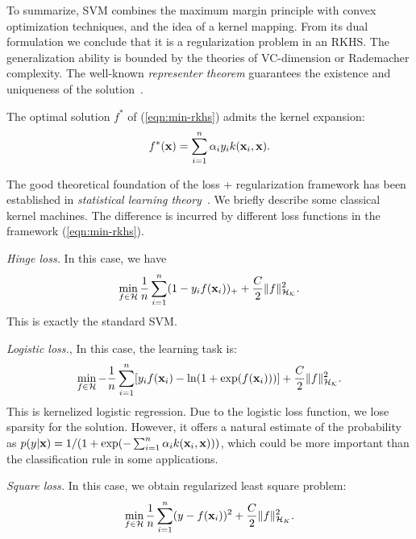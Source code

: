 To summarize, SVM combines the maximum margin principle with convex optimization techniques, and the idea of a kernel mapping. From its dual formulation we conclude that it is a regularization problem in an RKHS. The generalization ability is bounded by the theories of VC-dimension or Rademacher complexity. The well-known {\em representer theorem} guarantees the existence and uniqueness of the solution~\cite{colt/ScholkopfHS01}.

\begin{theorem}
The optimal solution $f^*$ of (\ref{eqn:min-rkhs}) admits the kernel expansion:
\[
f^*(\mathbf{x})=\sum_{i=1}^{n}{\alpha}_iy_ik(\mathbf{x}_i,\mathbf{x}).
\]
\end{theorem}

The good theoretical foundation of the loss + regularization framework has been established in {\em statistical learning theory}~\cite{Vapnik98}. We briefly describe some classical kernel machines. The difference is incurred by different loss functions in the framework (\ref{eqn:min-rkhs}).

{\em Hinge loss.} In this case, we have
\[
\min_{f\in\cal H}\frac{1}{n}\sum_{i=1}^n(1-y_if(\mathbf{x}_i))_++\frac{C}{2}\|f\|^2_{\cal H_K}.
\]
This is exactly the standard SVM.

{\em Logistic loss.}, In this case, the learning task is:
\[
\min_{f\in\cal H}-\frac{1}{n}\sum_{i=1}^n[y_if(\mathbf{x}_i)-\ln(1+\exp(f(\mathbf{x}_i)))]+\frac{C}{2}\|f\|^2_{\cal H_K}.
\]
This is kernelized logistic regression. Due to the logistic loss function, we lose sparsity for the solution. However, it offers a natural estimate of the probability as $p(y|\mathbf{x})=1/(1+\exp(-\sum_{i=1}^n{\alpha}_ik(\mathbf{x}_i,\mathbf{x})))$, which could be more important than the classification rule in some applications.

{\em Square loss.} In this case, we obtain regularized least square problem:
\[
\min_{f\in{\cal H}}\frac{1}{n}\sum_{i=1}^n(y-f(\mathbf{x}_i))^2+\frac{C}{2}\|f\|^2_{{\cal H}_K}.
\]

%

